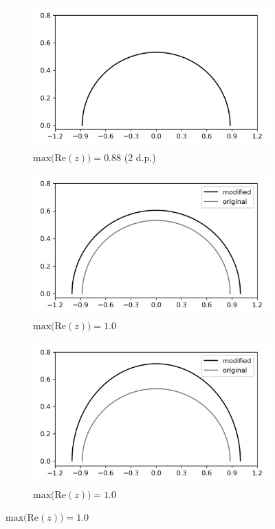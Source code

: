 \documentclass[a4paper]{report}
\begin{document}
\begin{figure}[H]
    \begin{subfigure}{.3\linewidth}
      \includegraphics[width=\linewidth]{images/sinh_param_analysis/sinh_0_88.png}
      \caption{$\text{max(Re}(z)) = 0.88$ (2 d.p.)}
      \label{fig:extent_default}
    \end{subfigure}\hfill
    \begin{subfigure}{.3\linewidth}
      \includegraphics[width=\linewidth]{images/sinh_param_analysis/sinh_1_b.png}
      \caption{$\text{max(Re}(z)) = 1.0$ }
      \label{fig:extent_b}
    \end{subfigure}\hfill
    \begin{subfigure}{.3\linewidth}
      \includegraphics[width=\linewidth]{images/sinh_param_analysis/sinh_1_y.png}
      \caption{$\text{max(Re}(z)) = 1.0$}
      \label{fig:extent_y}
    \end{subfigure}
    

\end{figure}
\end{document}
